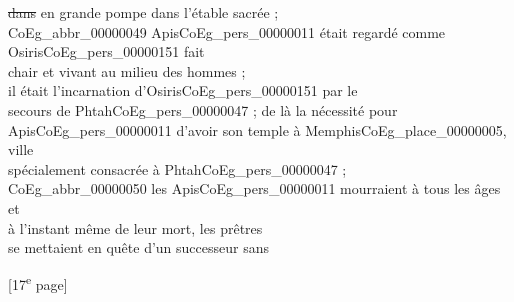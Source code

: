 \documentclass{book}
\begin{document}
{\begin{paracol}{2}
\sout{dans} en grande pompe dans l’étable sacrée ;\\
\indent \gls{CoEg_abbr_00000049} Apis\gls{CoEg_pers_00000011} était regardé comme Osiris\gls{CoEg_pers_00000151} fait\\
chair et vivant au milieu des hommes ;\\
il était l’incarnation d’Osiris\gls{CoEg_pers_00000151} par le\\
secours de Phtah\gls{CoEg_pers_00000047} ; de là la nécessité pour\\
Apis\gls{CoEg_pers_00000011} d’avoir son temple à Memphis\gls{CoEg_place_00000005}, ville\\
spécialement consacrée à Phtah\gls{CoEg_pers_00000047} ;\\
\indent \gls{CoEg_abbr_00000050} les Apis\gls{CoEg_pers_00000011} mourraient à tous les âges et\\
à l’instant même de leur mort, les prêtres\\
se mettaient en quête d’un successeur sans
\end{paracol}

{\footnotesize\begin{center} {[17\textsuperscript{e} page]}\end{center}}

}
\end{document}
